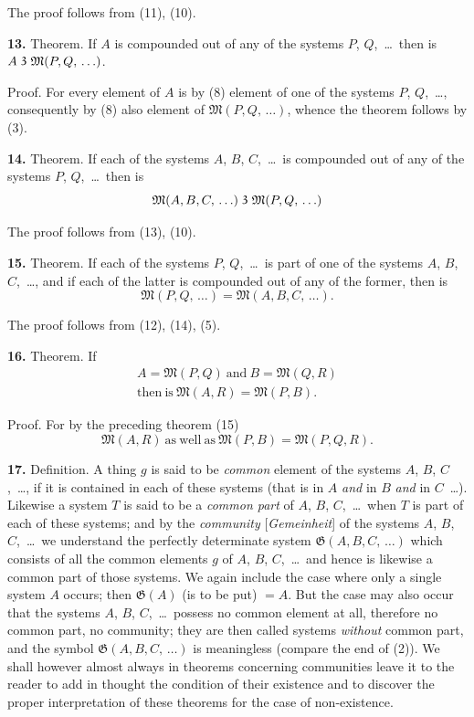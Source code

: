 \documentclass[oneside]{book}
\newcommand\partof{\mathrel{\raisebox{0.45ex}{$\mathfrak{3}$}}}   %
\newcommand\mypara{\medskip\textbf}
\begin{document}
The proof follows from (11), (10).

\mypara{13.} Theorem. If $A$ is compounded out of any of
the systems $P$, $Q$,~\ldots\ then is $A \partof \mathfrak{M}(P, Q,\,\ldots)$.

Proof. For every element of $A$ is by (8) element
of one of the systems $P$, $Q$,~\ldots, consequently by (8)
also element of $\mathfrak{M}(P, Q,\,\ldots)$, whence the theorem
follows by (3).

\mypara{14.} Theorem. If each of the systems $A$, $B$, $C$,~\ldots\
is compounded out of any of the systems $P$, $Q$,~\ldots\
then is
\[
\mathfrak{M}(A,B,C,\,\ldots) \partof \mathfrak{M}(P,Q,\,\ldots)
\]

The proof follows from (13), (10).

\mypara{15.} Theorem.  If each of the systems $P$, $Q$,~\ldots\
is part of one of the systems $A$, $B$, $C$,~\ldots, and if
each of the latter is compounded out of any of the
former, then is
\[
\mathfrak{M}(P, Q,\, \ldots) = \mathfrak{M}(A, B, C,\, \ldots).
\]

The proof follows from (12), (14), (5).

\mypara{16.} Theorem.  If
\begin{gather*}
A = \mathfrak{M}(P, Q) \mathrm{\ and\ } B = \mathfrak{M}(Q, R)  \\
\mathrm{then\ is\ } \mathfrak{M}(A, R) = \mathfrak{M}(P, B).
\end{gather*}

Proof.  For by the preceding theorem (15)
\[
\mathfrak{M}(A, R) \mathrm{\ as\ well\ as\ } \mathfrak{M}(P, B) = \mathfrak{M}(P, Q, R).
\]

\mypara{17.} Definition.  A thing $g$ is said to be \textit{common}
element of the systems $A$, $B$, $C$,~\ldots, if it is contained
in each of these systems (that is in $A$ \textit{and} in $B$ \textit{and}
in $C$~\ldots). Likewise a system $T$ is said to be a \textit{common
part} of $A$, $B$, $C$,~\ldots\ when $T$ is part of each of
these systems; and by the \textit{community} [\textit{Gemeinheit}] of
the systems $A$, $B$, $C$,~\ldots\ we understand the perfectly
determinate system $\mathfrak{G}(A, B, C,\,\ldots)$ which consists
of all the common elements $g$ of $A$, $B$, $C$,~\ldots\ and
hence is likewise a common part of those systems.
We again include the case where only a single system
$A$ occurs; then $\mathfrak{G}(A)$ (is to be put) $=A$. But the
case may also occur that the systems $A$, $B$, $C$,~\ldots\
possess no common element at all, therefore no common
part, no community; they are then called systems
\textit{without} common part, and the symbol $\mathfrak{G}(A, B,
C,\,\ldots)$ is meaningless (compare the end of (2)).
We shall however almost always in theorems concerning
communities leave it to the reader to add in
thought the condition of their existence and to discover
the proper interpretation of these theorems for
the case of non-existence.
\end{document}
